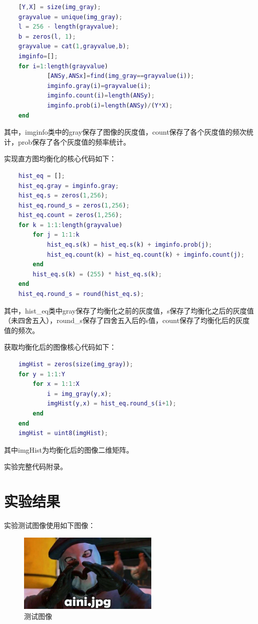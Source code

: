 \documentclass{../source/Experiment}
\begin{document}
        \begin{lstlisting}[language = matlab]
    % 获取灰度直方图的信息（r，数量，概率）
    [Y,X] = size(img_gray);
    grayvalue = unique(img_gray);
    l = 256 - length(grayvalue);
    b = zeros(l, 1);
    grayvalue = cat(1,grayvalue,b);
    imginfo=[];
    for i=1:length(grayvalue)
            [ANSy,ANSx]=find(img_gray==grayvalue(i));
            imginfo.gray(i)=grayvalue(i);
            imginfo.count(i)=length(ANSy);
            imginfo.prob(i)=length(ANSy)/(Y*X);
    end 
        \end{lstlisting}
        其中，imginfo类中的gray保存了图像的灰度值，count保存了各个灰度值的频次统计，prob保存了各个灰度值的频率统计。

        实现直方图均衡化的核心代码如下：
        \begin{lstlisting}[language = matlab]
    % 获取量化后的灰度s，数量，概率
    hist_eq = [];
    hist_eq.gray = imginfo.gray;
    hist_eq.s = zeros(1,256);
    hist_eq.round_s = zeros(1,256);
    hist_eq.count = zeros(1,256);
    for k = 1:1:length(grayvalue)
        for j = 1:1:k
            hist_eq.s(k) = hist_eq.s(k) + imginfo.prob(j);
            hist_eq.count(k) = hist_eq.count(k) + imginfo.count(j);
        end
        hist_eq.s(k) = (255) * hist_eq.s(k);
    end
    hist_eq.round_s = round(hist_eq.s);
        \end{lstlisting}
        其中，hist\_eq类中gray保存了均衡化之前的灰度值，s保存了均衡化之后的灰度值（未四舍五入），round\_s保存了四舍五入后的s值，count保存了均衡化后的灰度值的频次。

        获取均衡化后的图像核心代码如下：
        \begin{lstlisting}[language = matlab]
    % 获取均衡化后的图像
    imgHist = zeros(size(img_gray));
    for y = 1:1:Y
        for x = 1:1:X
            i = img_gray(y,x);
            imgHist(y,x) = hist_eq.round_s(i+1);
        end
    end
    imgHist = uint8(imgHist);
        \end{lstlisting}
        其中imgHist为均衡化后的图像二维矩阵。

        实验完整代码附录。
    \section{实验结果}
        实验测试图像使用如下图像：
        \begin{figure}[H]
            \centering
            \includegraphics[width = 0.6\textwidth]{第一次/aini.jpg}
            \caption{测试图像}
        \end{figure}
\end{document}
